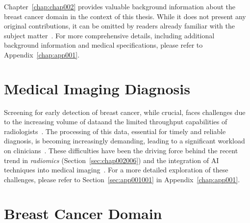 \fancychapter{\textcolor{revised}{Problem Context}}
\clearpage
\label{chap:chap002}

Chapter~\ref{chap:chap002} provides valuable background information about the breast cancer domain in the context of this thesis.
While it does not present any original contributions, it can be omitted by readers already familiar with the subject matter~\cite{doi:10.1148/ryai.2020190208}.
For more comprehensive details, including additional background information and medical specifications, please refer to Appendix~\ref{chap:app001}.

\section{Medical Imaging Diagnosis}
\label{sec:chap002001}

\textcolor{revised}{Screening for early detection of breast cancer, while crucial, faces challenges due to the increasing volume of data\footnotemark[4] and the limited throughput capabilities of radiologists~\cite{McKinney2020}.
The processing of this data, essential for timely and reliable diagnosis, is becoming increasingly demanding, leading to a significant workload on clinicians~\cite{HANNA20181709}.
These difficulties have been the driving force behind the recent trend in {\it radiomics} (Section~\ref{sec:chap002006}) and the integration of \ac{AI} techniques into medical imaging~\cite{doi:10.1148/radiol.2015151169}.
For a more detailed exploration of these challenges, please refer to Section~\ref{sec:app001001} in Appendix~\ref{chap:app001}.}


\section{Breast Cancer Domain}
\label{sec:chap002002}

